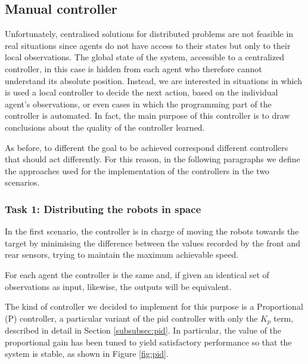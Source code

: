 \subsection{Manual controller}
\label{subsec:manual}

Unfortunately, centralised solutions for distributed problems are not feasible in 
real situations since agents do not have access to their states but only to their local 
observations. The global state of the system, accessible to a centralized controller, 
in this case is hidden from each agent who therefore cannot understand its 
absolute position.
Instead, we are interested in situations in which is used a local controller to decide 
the next action, based on the individual agent's observations, or even cases in 
which the programming part of the controller is automated.
In fact, the main purpose of this controller is to draw conclusions about the 
quality of the controller learned.

As before, to different the goal to be achieved correspond different controllers 
that should act differently. For this reason, in the following paragraphs we define 
the approaches used for the implementation of the controllers in the two 
scenarios.

\subsubsection{Task 1: Distributing the robots in space}
\label{subsubsec:manualtask1}
In the first scenario, the controller is in charge of moving the robots towards the 
target by minimising the difference between the values recorded by the front and 
rear sensors, trying to maintain the maximum achievable speed.

For each agent the controller is the same and, if given an identical set of 
observations as input, likewise, the outputs will be equivalent.

The kind of controller we decided to implement for this purpose is a Proportional 
(P) controller, a particular variant of the \gls{pid} controller with only the $K_p$ 
term, described in detail in Section \ref{subsubsec:pid}. 
In particular, the value of the proportional gain has been tuned to yield 
satisfactory performance so that the system is stable, as shown in Figure 
\ref{fig:pid}. 


